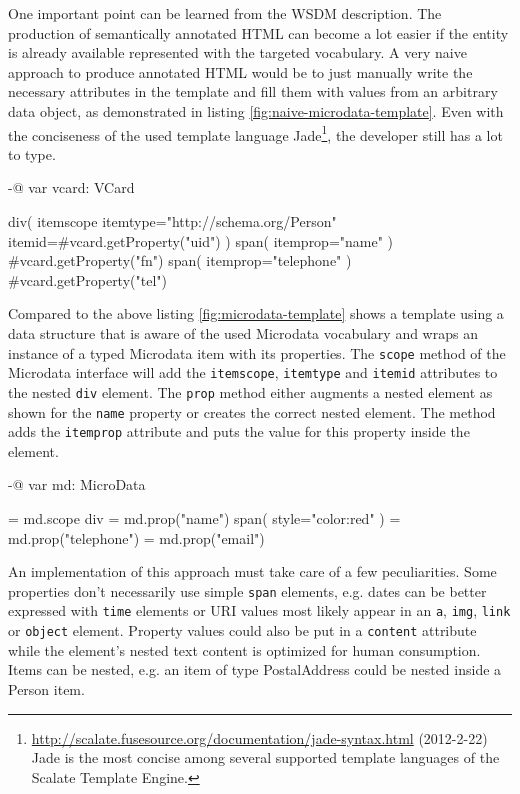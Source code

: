 \documentclass[12pt,a4paper,twoside]{scrartcl}		%
\newcommand{\citeurl}[2]{\url{#1} (#2)}
\begin{document}
One important point can be learned from the WSDM description. The production of
semantically annotated HTML can become a lot easier if the entity is already
available represented with the targeted vocabulary. A very naive approach to
produce annotated HTML would be to just manually write the necessary attributes
in the template and fill them with values from an arbitrary data object, as
demonstrated in listing \ref{fig:naive-microdata-template}. Even with the
conciseness of the used template language
Jade\footnote{\citeurl{http://scalate.fusesource.org/documentation/jade-syntax.html}{2012-2-22}
  Jade is the most concise among several supported template languages of the
  Scalate Template Engine.}, the developer still has a lot to type.

\begin{anylisting}[label=fig:naive-microdata-template,
                   caption={Defining all Microdata attributes manually in an HTML template}]
-@ var vcard: VCard

div( itemscope itemtype="http://schema.org/Person" 
     itemid=#{vcard.getProperty("uid")} )
  span( itemprop="name" )
    #{vcard.getProperty("fn")}
  span( itemprop="telephone" ) 
    #{vcard.getProperty("tel")}
\end{anylisting}

Compared to the above listing \ref{fig:microdata-template} shows a template
using a data structure that is aware of the used Microdata vocabulary and wraps
an instance of a typed Microdata item with its properties. The
\lstinline:scope: method of the Microdata interface will add the
\lstinline:itemscope:, \lstinline:itemtype: and \lstinline:itemid: attributes to
the nested \lstinline:div: element. The \lstinline:prop: method either augments
a nested element as shown for the \lstinline:name: property or creates the
correct nested element. The method adds the \lstinline:itemprop: attribute and
puts the value for this property inside the element.

\begin{anylisting}[label=fig:microdata-template,
                   caption={Using a Microdata-aware data structure in a template}]
-@ var md: MicroData

= md.scope
  div
    = md.prop("name")
      span( style="color:red" )
    = md.prop("telephone")
    = md.prop("email")
\end{anylisting}

An implementation of this approach must take care of a few
peculiarities\cite{Hickson2011}. Some properties don't necessarily use simple
\lstinline:span: elements, e.g. dates can be better expressed with
\lstinline:time: elements or URI values most likely appear in an
\lstinline:a:, \lstinline:img:, \lstinline:link: or \lstinline:object:
element. Property values could also be put in a \lstinline:content: attribute
while the element's nested text content is optimized for human
consumption. Items can be nested, e.g. an item of type PostalAddress could be
nested inside a Person item.
\end{document}
